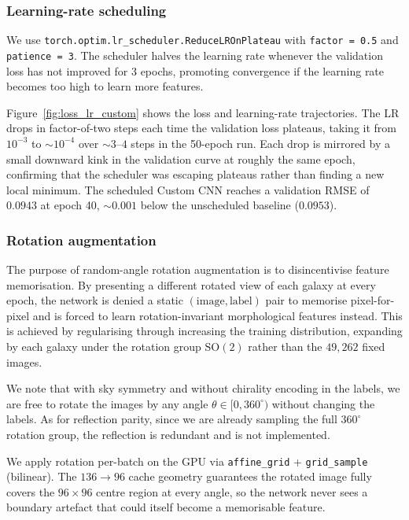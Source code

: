 \documentclass[10pt,preprint2]{aastex}
\begin{document}
\subsubsection{Learning-rate scheduling}

We use \texttt{torch.optim.lr\_scheduler.ReduceLROnPlateau} with \texttt{factor = 0.5} and \texttt{patience = 3}. The scheduler halves the learning rate whenever the validation loss has not improved for 3 epochs, promoting convergence if the learning rate becomes too high to learn more features.

Figure~\ref{fig:loss_lr_custom} shows the loss and learning-rate trajectories. The LR drops in factor-of-two steps each time the validation loss plateaus, taking it from $10^{-3}$ to $\sim 10^{-4}$ over $\sim 3$--$4$ steps in the 50-epoch run. Each drop is mirrored by a small downward kink in the validation curve at roughly the same epoch, confirming that the scheduler was escaping plateaus rather than finding a new local minimum. The scheduled Custom CNN reaches a validation RMSE of $0.0943$ at epoch 40, $\sim 0.001$ below the unscheduled baseline ($0.0953$).

\subsubsection{Rotation augmentation}

The purpose of random-angle rotation augmentation is to disincentivise feature memorisation. By presenting a different rotated view of each galaxy at every epoch, the network is denied a static $(\mathrm{image}, \mathrm{label})$ pair to memorise pixel-for-pixel and is forced to learn rotation-invariant morphological features instead. This is achieved by regularising through increasing the training distribution, expanding by each galaxy under the rotation group $\mathrm{SO}(2)$ rather than the $49{,}262$ fixed images.

We note that with sky symmetry and without chirality encoding in the labels, we are free to rotate the images by any angle $\theta \in [0, 360^\circ)$ without changing the labels. As for reflection parity, since we are already sampling the full $360^\circ$ rotation group, the reflection is redundant and is not implemented.

We apply rotation per-batch on the GPU via \texttt{affine\_grid} + \texttt{grid\_sample} (bilinear). The $136 \to 96$ cache geometry guarantees the rotated image fully covers the $96 \times 96$ centre region at every angle, so the network never sees a boundary artefact that could itself become a memorisable feature.
\end{document}
